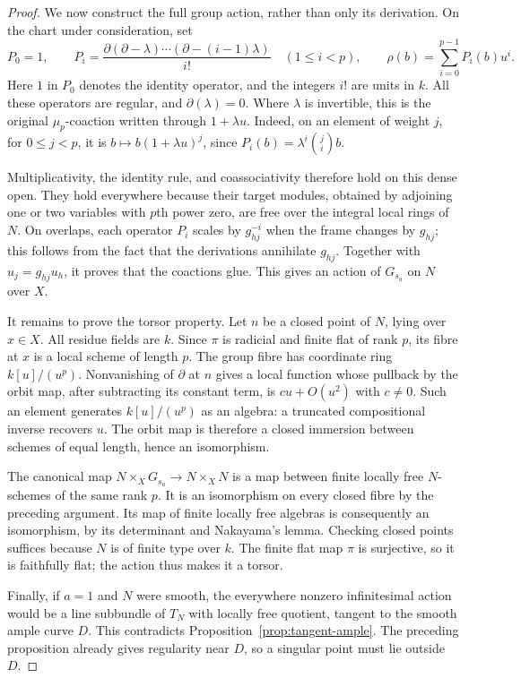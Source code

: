 \begin{proof}
We now construct the full group action, rather than only its
derivation. On the chart under consideration, set
\[
 P_0=1,\qquad
 P_i=\frac{\partial(\partial-\lambda)\cdots
 (\partial-(i-1)\lambda)}{i!}\quad(1\leq i<p),
 \qquad
 \rho(b)=\sum_{i=0}^{p-1}P_i(b)u^i.
\]
Here $1$ in $P_0$ denotes the identity operator, and the integers
$i!$ are units in $k$. All these operators are regular, and
$\partial(\lambda)=0$. Where $\lambda$ is invertible, this is the
original $\mu_p$-coaction written through $1+\lambda u$.
Indeed, on an element of weight $j$, for $0\leq j<p$, it is
$b\mapsto b(1+\lambda u)^j$, since
$P_i(b)=\lambda^i\binom ji b$.

Multiplicativity, the identity rule, and coassociativity therefore
hold on this dense open. They hold everywhere because their target
modules, obtained by adjoining one or two variables with $p$th
power zero, are free over the integral local rings of $N$.
On overlaps, each operator $P_i$ scales by $g_{hj}^{-i}$ when the
frame changes by $g_{hj}$; this follows from the fact that the
derivations annihilate $g_{hj}$. Together with $u_j=g_{hj}u_h$, it proves that
the coactions glue. This gives an action of $G_{s_a}$ on $N$ over $X$.

It remains to prove the torsor property. Let $n$ be a closed point
of $N$, lying over $x\in X$. All residue fields are $k$. Since
$\pi$ is radicial and finite flat of rank $p$, its fibre at $x$
is a local scheme of length $p$. The group fibre has coordinate
ring $k[u]/(u^p)$. Nonvanishing of $\partial$ at $n$ gives a local
function whose pullback by the orbit map, after subtracting its
constant term, is $cu+O(u^2)$ with $c\ne0$. Such an element
generates $k[u]/(u^p)$ as an algebra: a truncated compositional
inverse recovers $u$. The orbit map is therefore a closed immersion
between schemes of equal length, hence an isomorphism.

The canonical map $N\times_XG_{s_a}\to N\times_XN$ is a map
between finite locally free $N$-schemes of the same rank $p$.
It is an isomorphism on every closed fibre by the preceding argument.
Its map of finite locally free algebras is consequently an
isomorphism, by its determinant and Nakayama's lemma. Checking
closed points suffices because $N$ is of finite type over $k$.
The finite flat map $\pi$ is surjective, so it is faithfully flat;
the action thus makes it a torsor.

Finally, if $a=1$ and $N$ were smooth, the everywhere nonzero
infinitesimal action would be a line subbundle of $T_N$ with
locally free quotient, tangent to the smooth ample curve $D$.
This contradicts Proposition~\ref{prop:tangent-ample}.
The preceding proposition already gives regularity near $D$,
so a singular point must lie outside $D$.
\end{proof}

